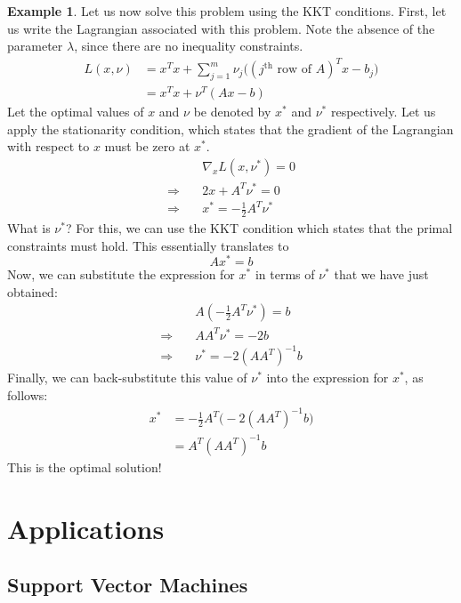 \documentclass[a4paper]{article}
\theoremstyle{definition}
\newtheorem{example}{Example}[subsection]
\begin{document}
\begin{example}
	Let us now solve this problem using the KKT conditions.
	First, let us write the Lagrangian associated with this problem.
	Note the absence of the parameter $\lambda$, since there are no inequality constraints.
	\begin{align*}
		L(x, \nu) & = x^T x + \sum_{j=1}^m \nu_j \big( (j^\text{th} \text{ row of } A)^T x - b_j \big) \\
		& = x^T x + \nu^T (Ax - b)
	\end{align*}
	Let the optimal values of $x$ and $\nu$ be denoted by $x^*$ and $\nu^*$ respectively.
	Let us apply the stationarity condition, which states that the gradient of the Lagrangian with respect to $x$ must be zero at $x^*$.
	\begin{align*}
		& \nabla_x L(x, \nu^*) = 0 \\
		\Rightarrow \quad & 2x + A^T \nu^* = 0 \\
		\Rightarrow \quad & x^* = -\frac{1}{2} A^T \nu^*
	\end{align*}
	What is $\nu^*$?
	For this, we can use the KKT condition which states that the primal constraints must hold.
	This essentially translates to
	\begin{equation*}
		Ax^* = b
	\end{equation*}
	Now, we can substitute the expression for $x^*$ in terms of $\nu^*$ that we have just obtained:
	\begin{align*}
		& A \left( -\frac{1}{2} A^T \nu^* \right) = b \\
		\Rightarrow \quad & A A^T \nu^* = -2b \\
		\Rightarrow \quad & \nu^* = -2 (A A^T)^{-1} b
	\end{align*}
	Finally, we can back-substitute this value of $\nu^*$ into the expression for $x^*$, as follows:
	\begin{align*}
		x^* & = -\frac{1}{2} A^T \big( -2 (A A^T)^{-1} b \big) \\
		& = A^T (A A^T)^{-1} b
	\end{align*}
	This is the optimal solution!
\end{example}

\section{Applications}

\subsection{Support Vector Machines}
\end{document}
